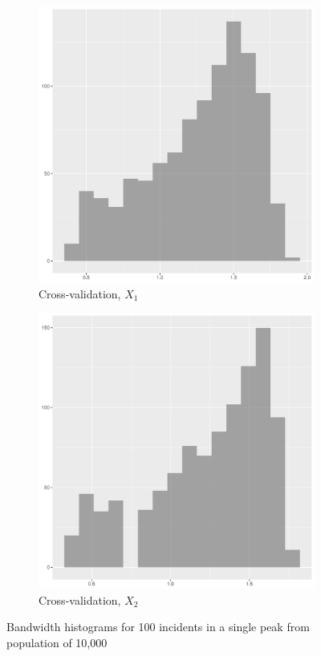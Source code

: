 \begin{figure}[htbp]
\begin{subfigure}[b]{0.3\textwidth}
    \includegraphics[width=\textwidth]{results/unif_100_1.0_1h/output/bandwidths-x1}
    \caption{Cross-validation, \(X_1\)}
    \label{fig:bandwidths_x1:unif_100_1.0_1h:x1}
    \end{subfigure}
    \begin{subfigure}[b]{0.3\textwidth}
    \includegraphics[width=\textwidth]{results/unif_100_1.0_1h/output/bandwidths-x2}
    \caption{Cross-validation, \(X_2\)}
    \label{fig:bandwidths_x1:unif_100_1.0_1h:x2}
    \end{subfigure}
    \caption{Bandwidth histograms for 100 incidents in a single peak from population of 10,000}
\end{figure}

